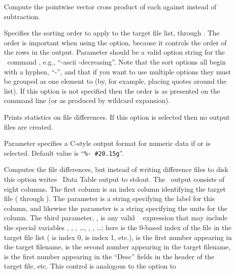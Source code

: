 \begin{description}
\item[]
  Compute the pointwise vector cross product
  of each  against  instead of subtraction.
\item[]
  Specifies the sorting order to apply to the target file list,
   through .  The order is important when using
  the  option, because it controls the order of the rows in the
  output.  Parameter  should be a valid option string for the
  \Tcl\ command , e.g., ``-ascii -decreasing''.  Note that the
   sort options all begin with a hyphen, ``-'', and that if
  you want to use multiple options they must be grouped as one element
  to  (by, for example, placing quotes around the list).
  If this option is not specified then the order is as presented on the
  command line (or as produced by wildcard expansion).
\item[]
  Prints statistics on file differences.  If this option is selected
  then no output files are created.
\item[]
  Parameter  specifies a C-style output format for numeric data if
   or  is selected.  Default value is
  ``\verb+%- #20.15g+''.
\item[]
  Computes the file differences, but instead of writing difference files
  to disk this option writes \OOMMF\ Data Table
   output to
  stdout.  The \ODT\ output consists of eight columns.  The first column
  is an index column identifying the target file ( through
  ).  The  parameter is a string specifying the
  label for this column, and likewise the  parameter is a
  string specifying the units for the column.  The third parameter,
  , is any valid \Tcl\  expression that may
  include the special variables , , , \ldots,
  , , \ldots; here  is the 0-based index of
  the file in the target file list ( is index 0, 
  is index 1, etc.),  is the first number appearing in the
  target filename,  is the second number appearing in the target
  filename,  is the first number appearing in the ``Desc''
  fields in the header of the target file, etc.  This control is
  analogous to the  option to

\end{description}
